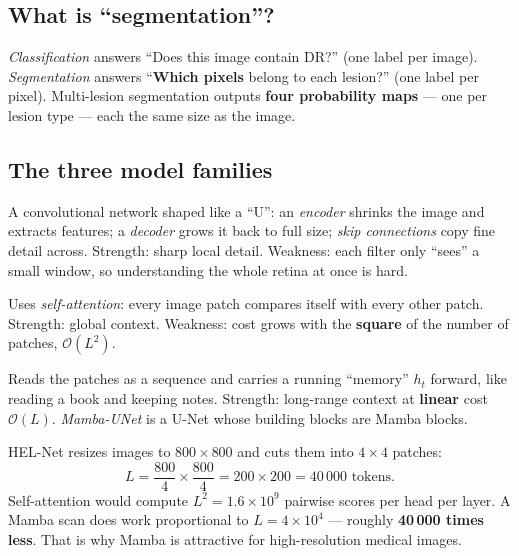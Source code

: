 \documentclass[11pt,a4paper]{article}
\begin{document}
\subsection{What is ``segmentation''?}
\begin{idea}
\emph{Classification} answers ``Does this image contain DR?'' (one label per image).
\emph{Segmentation} answers ``\textbf{Which pixels} belong to each lesion?'' (one label per pixel).
Multi-lesion segmentation outputs \textbf{four probability maps} --- one per lesion type --- each the
same size as the image.
\end{idea}

\subsection{The three model families}
\begin{description}[leftmargin=0pt,style=nextline]
\item[CNN / U-Net (2015)] A convolutional network shaped like a ``U'': an \emph{encoder} shrinks the image
  and extracts features; a \emph{decoder} grows it back to full size; \emph{skip connections} copy fine
  detail across. Strength: sharp local detail. Weakness: each filter only ``sees'' a small window,
  so understanding the whole retina at once is hard.
\item[Transformer] Uses \emph{self-attention}: every image patch compares itself with every other patch.
  Strength: global context. Weakness: cost grows with the \textbf{square} of the number of patches,
  $\mathcal{O}(L^2)$.
\item[Mamba / State-Space Model (SSM)] Reads the patches as a sequence and carries a running
  ``memory'' $h_t$ forward, like reading a book and keeping notes. Strength: long-range context at
  \textbf{linear} cost $\mathcal{O}(L)$. \emph{Mamba-UNet} is a U-Net whose building blocks are Mamba
  blocks.
\end{description}

\begin{worked}
HEL-Net resizes images to $800\times800$ and cuts them into $4\times4$ patches:
\[
L=\frac{800}{4}\times\frac{800}{4}=200\times200=40\,000 \text{ tokens}.
\]
Self-attention would compute $L^2 = 1.6\times10^{9}$ pairwise scores per head per layer.
A Mamba scan does work proportional to $L=4\times10^{4}$ --- roughly \textbf{40\,000 times less}.
That is why Mamba is attractive for high-resolution medical images.
\end{worked}
\end{document}
